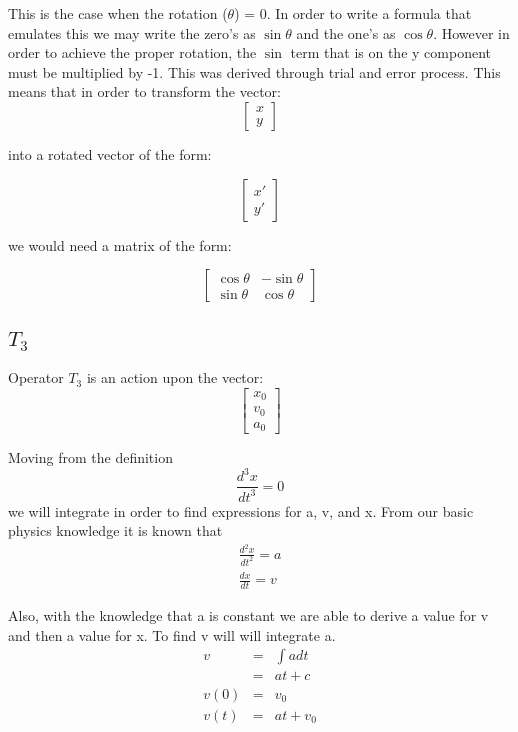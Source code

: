 \documentclass[12pt]{article}
\begin{document}
This is the case when the rotation ($\theta$) = 0. In order to write a formula that emulates this we may write the zero's as $\sin \theta$ and the one's as $\cos \theta$. However in order to achieve the proper rotation, the $\sin$ term that is on the y component must be multiplied by -1. This was derived through trial and error process. This means that in order to transform the vector:
\[
\begin{bmatrix}
x\\
y
\end{bmatrix}
\]

into a rotated vector of the form:

\[
\begin{bmatrix}
x'\\
y'
\end{bmatrix}
\]

we would need a matrix of the form:

\[
\begin{bmatrix}
\cos \theta & - \sin \theta\\
\sin \theta & \cos \theta
\end{bmatrix}
\]

\subsection{$T_{3}$}
Operator $T_{3}$ is an action upon the vector:\\
\[
\begin{bmatrix}
x_{0}\\
v_{0}\\
a_{0}
\end{bmatrix}
\]

Moving from the definition 
$$ \frac{d^{3}x}{dt^{3}} = 0 $$
we will integrate in order to find expressions for a, v, and x. From our basic physics knowledge it is known that
\begin{eqnarray*}
\frac{d^{2}x}{dt^{2}} = a\\
\frac{dx}{dt} = v
\end{eqnarray*}

Also, with the knowledge that a is constant we are able to derive a value for v and then a value for x. To find v will will integrate a.
\begin{eqnarray*}
v &=& \int a dt\\
&=& at + c \\
v(0) &=& v_{0}\\
v(t) &=& at + v_{0}
\end{eqnarray*}
\end{document}
